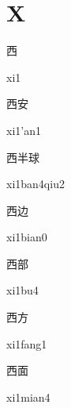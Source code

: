 ﻿%
\section*{X}
\begin{multicols*}{2}

\begin{verbete}[xi1]{西}
\begin{pronuncia}{xi1}
\end{pronuncia}
\end{verbete}

\begin{verbete}[xi1'an1]{西安}
\begin{pronuncia}{xi1'an1}
\end{pronuncia}
\end{verbete}

\begin{verbete}{西半球}
\begin{pronuncia}{xi1ban4qiu2}
\end{pronuncia}
\end{verbete}

\begin{verbete}[xi1bian0]{西边}
\begin{pronuncia}{xi1bian0}
\end{pronuncia}
\end{verbete}

\begin{verbete}[xi1bu4]{西部}
\begin{pronuncia}{xi1bu4}
\end{pronuncia}
\end{verbete}

\begin{verbete}[xi1fang1]{西方}
\begin{pronuncia}{xi1fang1}
\end{pronuncia}
\end{verbete}

\begin{verbete}[xi1mian4]{西面}
\begin{pronuncia}{xi1mian4}
\end{pronuncia}
\end{verbete}


\end{multicols*}
